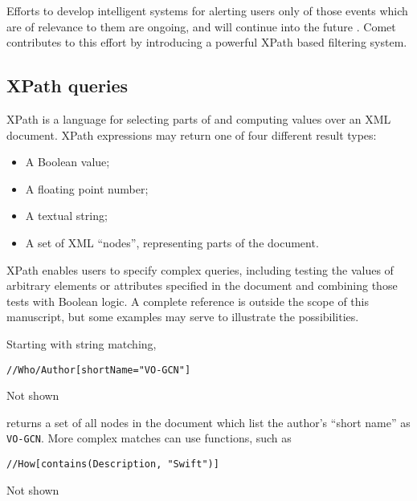 \documentclass[5p,authoryear]{elsarticle}
\begin{document}
Efforts to develop intelligent systems for alerting users only of those events
which are of relevance to them are ongoing, and will continue into the future
\citep{Williams:2009}. Comet contributes to this effort by introducing a
powerful XPath \citep{Clark:1999} based filtering system.

\subsection{XPath queries}
\label{sec:filter:xpath}

\begingroup
{}
\setcounter{savelisting}{\value{listing}}%
\setcounter{listing}{0}
\renewcommand\listingscaption{XPath expression}

XPath is a language for selecting parts of and computing values over an XML
document. XPath expressions may return one of four different result types:

\begin{itemize}
  \item{A Boolean value;}
  \item{A floating point number;}
  \item{A textual string;}
  \item{A set of XML ``nodes'', representing parts of the document.}
\end{itemize}

XPath enables users to specify complex queries, including testing
the values of arbitrary elements or attributes specified in the document and
combining those tests with Boolean logic. A complete reference is outside the
scope of this manuscript, but some examples may serve to illustrate the
possibilities.

Starting with string matching,

\begin{listing}[H]
\begin{verbatim}
//Who/Author[shortName="VO-GCN"]
\end{verbatim}
\vspace{-19pt}
\captionsetup{labelsep=none,textformat=empty,justification=raggedleft,singlelinecheck=false}
\caption{Not shown}
\label{xpath:exp1}
\end{listing}

returns a set of all nodes in the document which list the author's ``short
name'' as \texttt{VO-GCN}. More complex matches can use functions, such as

\begin{listing}[H]
\begin{verbatim}
//How[contains(Description, "Swift")]
\end{verbatim}
\vspace{-19pt}
\captionsetup{labelsep=none,textformat=empty,justification=raggedleft,singlelinecheck=false}
\caption{Not shown}
\label{xpath:exp2}
\end{listing}
\end{document}
